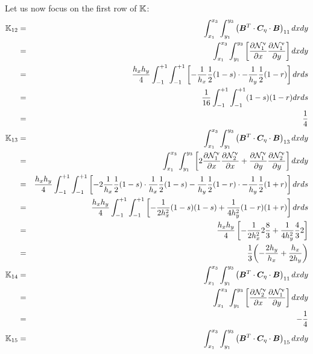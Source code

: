 Let us now focus on the first row of ${\mathbb{K}}$:
\begin{eqnarray}
\K_{12} 
&=& \int_{x_1}^{x_3} \int_{y_1}^{y_3} 
\left({\bm B}^T \cdot {\bm C}_\eta \cdot {\bm B}\right)_{11} dx dy \nn\\
&=& \int_{x_1}^{x_3} \int_{y_1}^{y_3}
\left[
\frac{\partial \bN_1^\upnu}{\partial x}
\frac{\partial \bN_1^\upnu}{\partial y}
\right] dxdy \nn\\
&=&  \frac{h_xh_y}{4} \int_{-1}^{+1} \int_{-1}^{+1} 
\left[
-\frac{1}{h_x}\frac12 (1-s) \cdot 
-\frac{1}{h_y}\frac12 (1-r) 
\right] drds \nn\\
&=&  \frac{1}{16} \int_{-1}^{+1} \int_{-1}^{+1}  (1-s) (1-r)   drds \nn\\
&=&  \frac14 \nn\\
\K_{13} 
&=& \int_{x_1}^{x_3} \int_{y_1}^{y_3} 
\left({\bm B}^T \cdot {\bm C}_\eta \cdot {\bm B}\right)_{13} dx dy \nn\\
&=& \int_{x_1}^{x_3} \int_{y_1}^{y_3}
\left[
2\frac{\partial \bN_1^\upnu}{\partial x}\frac{\partial \bN_2^\upnu}{\partial x} 
+\frac{\partial \bN_1^\upnu}{\partial y}\frac{\partial \bN_2^\upnu}{\partial y}
\right] dxdy \nn\\
&=& \frac{h_xh_y}{4} \int_{-1}^{+1} \int_{-1}^{+1} 
\left[ 
-2 \frac{1}{h_x}\frac12 (1-s)\cdot  \frac{1}{h_x}\frac12 (1-s)
-\frac{1}{h_y}\frac12 (1-r)\cdot -\frac{1}{h_y}\frac12 (1+r) 
\right] drds \nn\\
&=& \frac{h_xh_y}{4} \int_{-1}^{+1} \int_{-1}^{+1} 
\left[ 
- \frac{1}{2h_x^2}  (1-s) (1-s)
+\frac{1}{4h_y^2} (1-r) (1+r) 
\right] drds \nn\\
&=& \frac{h_xh_y}{4} 
\left[ - \frac{1}{2h_x^2} 2 \frac83 + \frac{1}{4h_y^2} \frac43 2 \right] \nn\\
&=& \frac{1}{3}\! \left( - \frac{2h_y}{h_x}  + \frac{h_x}{2h_y} \right) \nn\\
\K_{14} 
&=& \int_{x_1}^{x_3} \int_{y_1}^{y_3} 
\left({\bm B}^T \cdot {\bm C}_\eta \cdot {\bm B}\right)_{11} dx dy \nn\\
&=& \int_{x_1}^{x_3} \int_{y_1}^{y_3}
\left[
\frac{\partial \bN_2^\upnu}{\partial x}
\frac{\partial \bN_1^\upnu}{\partial y}
\right] dxdy \nn\\
&=& -\frac14 \nn\\
\K_{15} 
&=& \int_{x_1}^{x_3} \int_{y_1}^{y_3} 
\left({\bm B}^T \cdot {\bm C}_\eta \cdot {\bm B}\right)_{15} dx dy \nn\\

\end{eqnarray}
